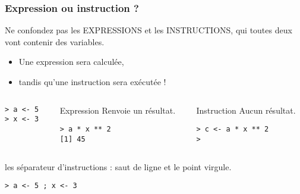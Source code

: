 \documentclass[10pt]{beamer}
\begin{document}

\begin{frame}[fragile]
  \frametitle{Expression ou instruction ?}
  Ne confondez pas les EXPRESSIONS et les INSTRUCTIONS, qui toutes deux vont contenir des variables.
  \begin{itemize}
  \item Une expression sera \alert{calculée},
  \item tandis qu'une instruction sera \alert{exécutée} !
  \end{itemize}



\begin{columns}[b]
\begin{column}{0.33\textwidth}
    \begin{lstlisting}
> a <- 5
> x <- 3
\end{lstlisting}

\end{column}

\begin{column}{0.33\textwidth}
  \begin{alertblock}{Expression}
    Renvoie un résultat.
    \begin{lstlisting}
> a * x ** 2
[1] 45
    \end{lstlisting}

  \end{alertblock}
\end{column}
\begin{column}{0.33\textwidth}
  \begin{alertblock}{Instruction}
    Aucun résultat.
    \begin{lstlisting}
> c <- a * x ** 2
>
    \end{lstlisting}
  \end{alertblock}
\end{column}
\end{columns}

\begin{block}{les séparateur d'instructions : saut de ligne et le point virgule.}
  \begin{lstlisting}[style=block]
> a <- 5 ; x <- 3
\end{lstlisting}

\end{block}
\end{frame}
\end{document}
